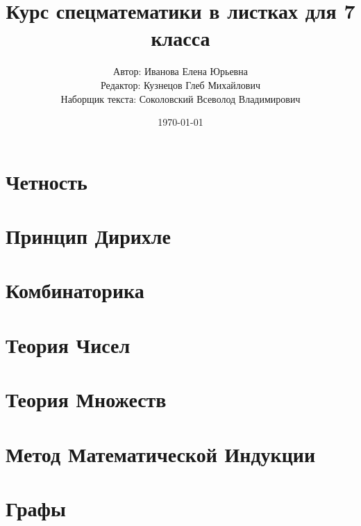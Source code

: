 \documentclass[11pt,a4paper]{report}
\title{Курс спецматематики в листках для 7 класса}
\author{Автор: Иванова Елена Юрьевна\\
	Редактор: Кузнецов Глеб Михайлович\\
	Наборщик текста: Соколовский Всеволод Владимирович}
\date{\today}
\theoremstyle{myrmk}
\theoremstyle{mypln}
\theoremstyle{mydfn}
\theoremstyle{myques}
\begin{document}
\maketitle
\tableofcontents
\newpage


\chapter{Четность}









\chapter{Принцип Дирихле}



\chapter{Комбинаторика}




\chapter{Теория Чисел}





\chapter{Теория Множеств}




\chapter{Метод Математической Индукции}

\chapter{Графы}

\end{document}
